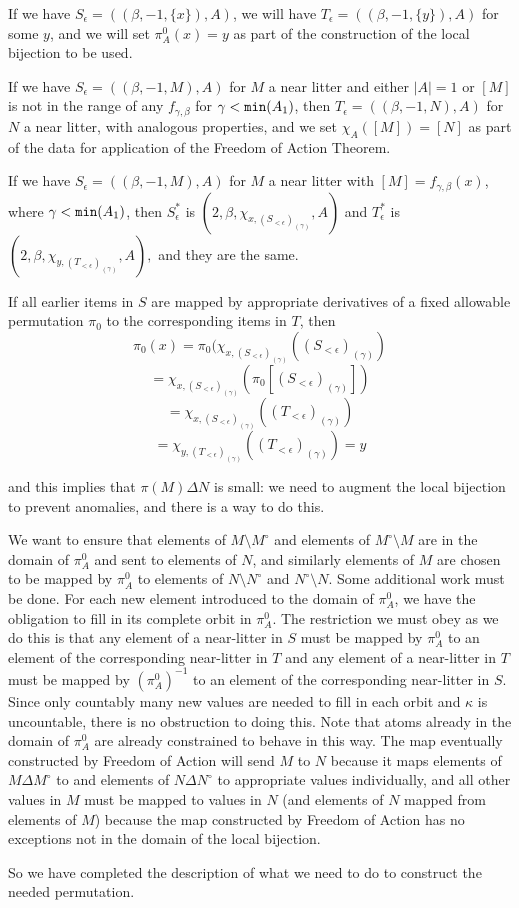 \documentclass[112pt]{article}
\begin{document}
\begin{description}
If we have $S_\epsilon = ((\beta,-1,\{x\}),A)$, we will have $T_\epsilon = ((\beta,-1,\{y\}),A)$ for some $y$, and we will set $\pi^0_A(x) = y$ as part of the construction of the local bijection to be used.

If we have $S_\epsilon = ((\beta,-1,M),A)$ for $M$ a near litter and either $|A|=1$ or $[M]$ is not in the range of any $f_{\gamma,\beta}$ for $\gamma<{\tt min}(A_1)$, then $T_\epsilon = ((\beta,-1,N),A)$ for $N$ a near litter, with analogous properties, and we set $\chi_A([M])=[N]$ as part of the data for application of the Freedom of Action Theorem.

If we have $S_\epsilon= ((\beta,-1,M),A)$ for $M$ a near litter with $[M] = f_{\gamma,\beta}(x)$, where $\gamma<{\tt min}(A_1)$,
then $S^*_\epsilon$ is $(2,\beta,\chi_{x,(S_{<\epsilon})_{(\gamma)}},A)$ and $T^*_\epsilon$ is $(2,\beta,\chi_{y,(T_{<\epsilon})_{(\gamma)}},A),$ and they are the same.

If all earlier items in $S$ are mapped by appropriate derivatives of a fixed allowable permutation $\pi_0$ to the corresponding items in $T$, then
$$\pi_0(x) = \pi_0(\chi_{x,(S_{<\epsilon})_{(\gamma)}}((S_{<\epsilon})_{(\gamma)}) $$ $$ = \chi_{x,(S_{<\epsilon})_{(\gamma)}}(\pi_0[(S_{<\epsilon})_{(\gamma)}])$$ $$ = \chi_{x,(S_{<\epsilon})_{(\gamma)}}((T_{<\epsilon})_{(\gamma)}) $$ $$= \chi_{y,(T_{<\epsilon})_{(\gamma)}}((T_{<\epsilon})_{(\gamma)})=y$$

and this implies that $\pi(M) \Delta N$ is small:  we need to augment the local bijection to prevent anomalies, and there is a way to do this.

We want to ensure that elements of $M \setminus M^{\circ}$ and elements of $M^{\circ} \setminus M$ are in the domain of $\pi^0_A$ and sent to elements of $N$, and similarly elements of $M$ are chosen to be mapped by $\pi^0_A$ to elements of $N\setminus N^\circ$ and $N^\circ \setminus N$.
 Some additional work must be done.  For each new element introduced to the domain of $\pi^0_A$, we have the obligation to fill in its complete orbit in $\pi^0_A$.   The restriction we must obey as we do this is that any element of a near-litter in $S$ must be mapped by $\pi^0_A$ to an element of the corresponding near-litter in $T$ and any element of a near-litter in $T$  must be mapped by $(\pi^0_A)^{-1}$ to an element of the corresponding near-litter in $S$.  Since only countably many new values are needed to fill in each orbit and $\kappa$ is uncountable, there is no obstruction to doing this.  Note that atoms already in the domain of $\pi^0_A$ are already constrained to behave in this way.  The map eventually constructed by Freedom of Action will send
$M$ to $N$ because it maps elements of $M \Delta M^\circ$ to and elements of $N \Delta N^{\circ}$ to appropriate values individually, and all other values in $M$ must be mapped to values in $N$ (and elements of $N$ mapped from elements of $M$) because the map constructed by Freedom of Action has no exceptions not in the domain of the local bijection.

So we have completed the description of what we need to do to construct the needed permutation.

\end{description}
\end{document}
